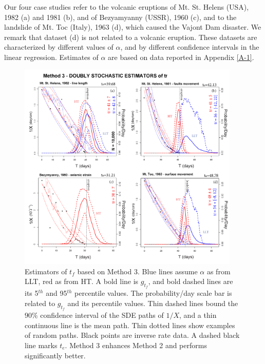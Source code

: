 \documentclass{article}
\begin{document}
Our four case studies refer to the volcanic eruptions of Mt. St. Helens (USA), 1982 (a) and 1981 (b), and of Bezyamyanny (USSR), 1960 (c), and to the landslide of Mt. Toc (Italy), 1963 (d), which caused the Vajont Dam disaster. We remark that dataset (d) is not related to a volcanic eruption. These datasets are characterized by different values of $\alpha$, and by different confidence intervals in the linear regression. Estimates of $\alpha$ are based on data reported in Appendix \ref{A-1}.

\begin{figure}[H]
\centering
\includegraphics[width=0.94\textwidth]{Fig7_plusX.png}
\caption{Estimators of $t_f$ based on Method 3. Blue lines assume $\alpha$ as from LLT, red as from HT. A bold line is $g_{t_f}$, and bold dashed lines are its 5$^{th}$ and 95$^{th}$ percentile values. The probability/day scale bar is related to $g_{t_f}$ and its percentile values. Thin dashed lines bound the $90\%$ confidence interval of the SDE paths of $1/X$, and a thin continuous line is the mean path. Thin dotted lines show examples of random paths. Black points are inverse rate data. A dashed black line marks $t_e$. Method 3 enhances Method 2 and performs significantly better.}
\label{Fig7}
\end{figure}
\end{document}
